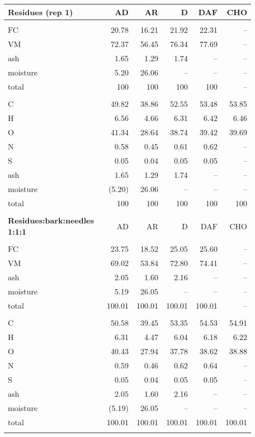 \begin{longtable}{lrrrrr}
    \textbf{Residues (rep 1)} & AD & AR & D & DAF & CHO \\
    \hline \\
    FC       & 20.78  & 16.21  & 21.92  & 22.31  & -- \\
    VM       & 72.37  & 56.45  & 76.34  & 77.69  & -- \\
    ash      & 1.65   & 1.29   & 1.74   & --     & -- \\
    moisture & 5.20   & 26.06  & --     & --     & -- \\
    total    & 100    & 100    & 100    & 100    & -- \\
    \\
    C        & 49.82  & 38.86  & 52.55  & 53.48  & 53.85 \\
    H        & 6.56   & 4.66   & 6.31   & 6.42   & 6.46 \\
    O        & 41.34  & 28.64  & 38.74  & 39.42  & 39.69 \\
    N        & 0.58   & 0.45   & 0.61   & 0.62   & -- \\
    S        & 0.05   & 0.04   & 0.05   & 0.05   & -- \\
    ash      & 1.65   & 1.29   & 1.74   & --     & -- \\
    moisture & (5.20) & 26.06  & --     & --     & -- \\
    total    & 100    & 100    & 100    & 100    & 100 \\
    \\

    \textbf{Residues:bark:needles 1:1:1} & AD & AR & D & DAF & CHO \\
    \hline \\
    FC       & 23.75  & 18.52  & 25.05  & 25.60  & -- \\
    VM       & 69.02  & 53.84  & 72.80  & 74.41  & -- \\
    ash      & 2.05   & 1.60   & 2.16   & --     & -- \\
    moisture & 5.19   & 26.05  & --     & --     & -- \\
    total    & 100.01 & 100.01 & 100.01 & 100.01 & -- \\
    \\
    C        & 50.58  & 39.45  & 53.35  & 54.53  & 54.91 \\
    H        & 6.31   & 4.47   & 6.04   & 6.18   & 6.22 \\
    O        & 40.43  & 27.94  & 37.78  & 38.62  & 38.88 \\
    N        & 0.59   & 0.46   & 0.62   & 0.64   & -- \\
    S        & 0.05   & 0.04   & 0.05   & 0.05   & -- \\
    ash      & 2.05   & 1.60   & 2.16   & --     & -- \\
    moisture & (5.19) & 26.05  & --     & --     & -- \\
    total    & 100.01 & 100.01 & 100.01 & 100.01 & 100.01 \\
    \\


\end{longtable}
